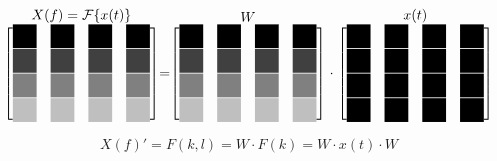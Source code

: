  \[
  \stackrel{\mbox{$X(f) = \mathcal{F}\{x(t)\}$}}{
   \begin{bmatrix}
    \myBlackBox 	& \myBlackBox 		& \myBlackBox 		& \myBlackBox \\
    \myDarkgrayBox 	& \myDarkgrayBox 	& \myDarkgrayBox 	& \myDarkgrayBox \\
    \myGrayBox 		& \myGrayBox 		& \myGrayBox 		& \myGrayBox \\
    \myLightgrayBox 	& \myLightgrayBox 	& \myLightgrayBox 	& \myLightgrayBox 
   \end{bmatrix}
  }
  =
  \stackrel{\mbox{$W$}}{
   \begin{bmatrix}
    \myBlackBox 	& \myBlackBox 		& \myBlackBox 		& \myBlackBox \\
    \myDarkgrayBox 	& \myDarkgrayBox 	& \myDarkgrayBox 	& \myDarkgrayBox \\
    \myGrayBox 		& \myGrayBox 		& \myGrayBox 		& \myGrayBox \\
    \myLightgrayBox 	& \myLightgrayBox 	& \myLightgrayBox 	& \myLightgrayBox 
   \end{bmatrix}
  }
  \cdot
  \stackrel{\mbox{$x(t)$}}{
   \begin{bmatrix}
    \myBlackBox & \myBlackBox & \myBlackBox & \myBlackBox \\
    \myBlackBox & \myBlackBox & \myBlackBox & \myBlackBox \\
    \myBlackBox & \myBlackBox & \myBlackBox & \myBlackBox \\
    \myBlackBox & \myBlackBox & \myBlackBox & \myBlackBox 
   \end{bmatrix}
  }
 \]

 \[
  X(f)' = F(k,l) = W \cdot F(k) = W \cdot x(t) \cdot W
 \]
 
